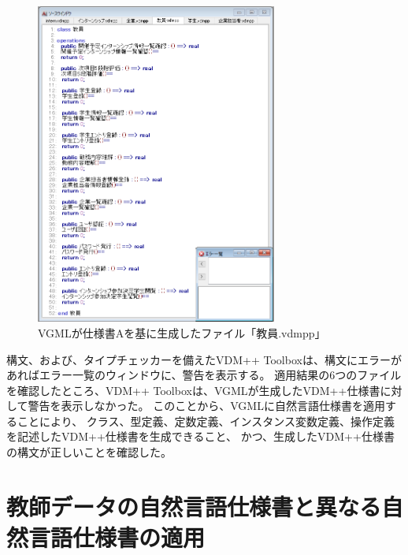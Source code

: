 \begin{figure}[tp]
    \begin{center}
    \includegraphics[width=300]{image/indication_vdm6.PNG}
    \caption{VGMLが仕様書Aを基に生成したファイル「教員.vdmpp」}
    \label{fig:indication_vdm6}
    \end{center}
\end{figure}

構文、および、タイプチェッカーを備えたVDM++ Toolboxは、構文にエラーがあればエラー一覧のウィンドウに、警告を表示する。
適用結果の6つのファイルを確認したところ、VDM++ Toolboxは、VGMLが生成したVDM++仕様書に対して警告を表示しなかった。
このことから、VGMLに自然言語仕様書を適用することにより、
クラス、型定義、定数定義、インスタンス変数定義、操作定義を記述したVDM++仕様書を生成できること、
かつ、生成したVDM++仕様書の構文が正しいことを確認した。

\section{教師データの自然言語仕様書と異なる自然言語仕様書の適用}
\label{sec:different_generate_vdm}


